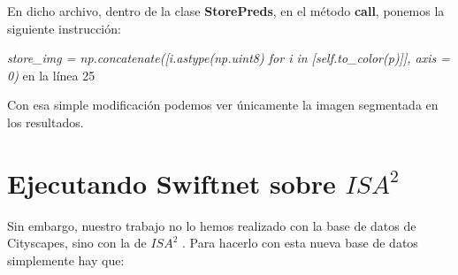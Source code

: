 En dicho archivo, dentro de la clase \textbf{StorePreds}, en el método \textbf{call}, ponemos la siguiente instrucción:

\begin{center}
\textit{store\_img = np.concatenate([i.astype(np.uint8) for i in [self.to\_color(p)]], axis = 0)} en la línea 25
\end{center}

Con esa simple modificación podemos ver únicamente la imagen segmentada en los resultados.

\section{Ejecutando Swiftnet sobre $ISA^{2}$}

Sin embargo, nuestro trabajo no lo hemos realizado con la base de datos de Cityscapes, sino con la de $ISA^{2}$ \cite{isa2}. Para hacerlo con esta nueva base de datos simplemente hay que:


